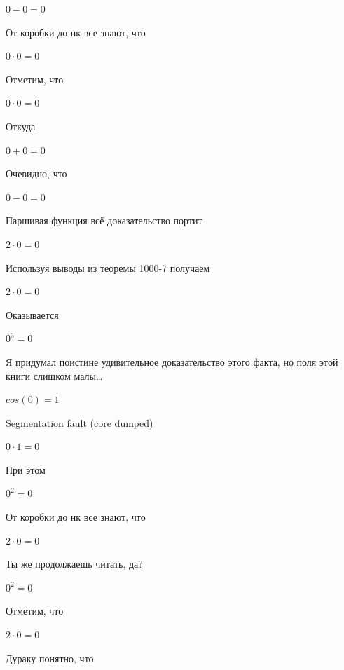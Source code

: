 \documentclass[12pt,a4paper,fleqn]{article}
\begin{document}
\begin{center}$0-0 = 0$\end{center}
От коробки до нк все знают, что

\begin{center}$0 \cdot 0 = 0$\end{center}
Отметим, что

\begin{center}$0 \cdot 0 = 0$\end{center}
Откуда

\begin{center}$0+0 = 0$\end{center}
Очевидно, что

\begin{center}$0-0 = 0$\end{center}
Паршивая функция всё доказательство портит\cite{link2}

\begin{center}$2 \cdot 0 = 0$\end{center}
Используя выводы из теоремы 1000-7 получаем

\begin{center}$2 \cdot 0 = 0$\end{center}
Оказывается

\begin{center}$0^{3} = 0$\end{center}
Я придумал поистине удивительное доказательство этого факта, но поля этой книги слишком малы\ldots

\begin{center}$cos(0) = 1$\end{center}
Segmentation fault (core dumped)

\begin{center}$0 \cdot 1 = 0$\end{center}
При этом

\begin{center}$0^{2} = 0$\end{center}
От коробки до нк все знают, что

\begin{center}$2 \cdot 0 = 0$\end{center}
Ты же продолжаешь читать, да?

\begin{center}$0^{2} = 0$\end{center}
Отметим, что

\begin{center}$2 \cdot 0 = 0$\end{center}
Дураку понятно, что
\end{document}
